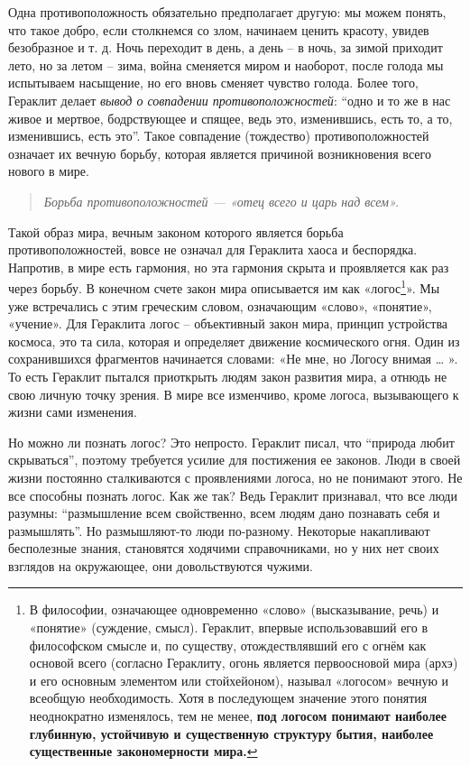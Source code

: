 \documentclass[a4paper, 14pt]{extreport}
\begin{document}
Одна противоположность обязательно предполагает другую: мы можем понять,
что такое добро, если столкнемся со злом, начинаем ценить красоту,
увидев безобразное и т. д. Ночь переходит в день, а день -- в ночь, за
зимой приходит лето, но за летом -- зима, война сменяется миром и
наоборот, после голода мы испытываем насыщение, но его вновь сменяет
чувство голода. Более того, Гераклит делает \emph{вывод о совпадении
противоположностей}: ``одно и то же в нас живое и мертвое, бодрствующее
и спящее, ведь это, изменившись, есть то, а то, изменившись, есть это''.
Такое совпадение (тождество) противоположностей означает их вечную
борьбу, которая является причиной возникновения всего нового в мире.

\begin{quote}
\emph{Борьба противоположностей --- «отец всего и царь над всем».}
\end{quote}

Такой образ мира, вечным законом которого является борьба
противоположностей, вовсе не означал для Гераклита хаоса и беспорядка.
Напротив, в мире есть гармония, но эта гармония скрыта и проявляется как
раз через борьбу. В конечном счете закон мира описывается им как
«логос\footnote{В философии, означающее одновременно «слово»
  (высказывание, речь) и «понятие» (суждение, смысл). Гераклит, впервые
  использовавший его в философском смысле и, по существу,
  отождествлявший его с огнём как основой всего (согласно Гераклиту,
  огонь является первоосновой мира (архэ) и его основным элементом или
  стойхейоном), называл «логосом» вечную и всеобщую необходимость. Хотя
  в последующем значение этого понятия неоднократно изменялось, тем не
  менее, \textbf{под логосом понимают наиболее глубинную, устойчивую и
  существенную структуру бытия, наиболее существенные закономерности
  мира.}}». Мы уже встречались с этим греческим словом, означающим
«слово», «понятие», «учение». Для Гераклита логос -- объективный закон
мира, принцип устройства космоса, это та сила, которая и определяет
движение космического огня. Один из сохранившихся фрагментов начинается
словами: «Не мне, но Логосу внимая \ldots{} ». То есть Гераклит пытался
приоткрыть людям закон развития мира, а отнюдь не свою личную точку
зрения. В мире все изменчиво, кроме логоса, вызывающего к жизни сами
изменения.

Но можно ли познать логос? Это непросто. Гераклит писал, что ``природа
любит скрываться'', поэтому требуется усилие для постижения ее законов.
Люди в своей жизни постоянно сталкиваются с проявлениями логоса, но не
понимают этого. Не все способны познать логос. Как же так? Ведь Гераклит
признавал, что все люди разумны: ``размышление всем свойственно, всем
людям дано познавать себя и размышлять''. Но размышляют-то люди
по-разному. Некоторые накапливают бесполезные знания, становятся
ходячими справочниками, но у них нет своих взглядов на окружающее, они
довольствуются чужими.
\end{document}
